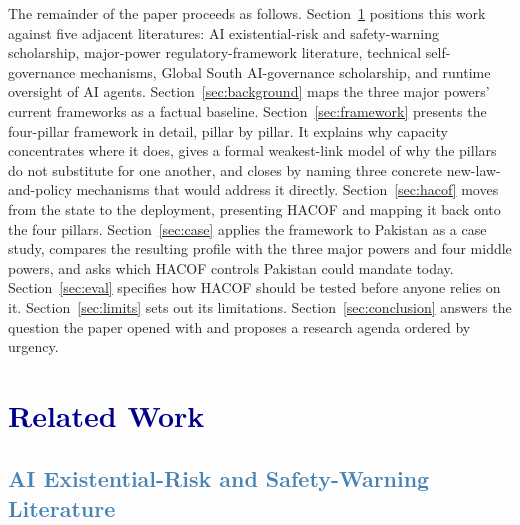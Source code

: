 \documentclass[journal]{IEEEtran}
\newcommand{\hacof}{HACOF}
\begin{document}
The remainder of the paper proceeds as follows. Section~\ref{sec:related} positions this work against five adjacent literatures: AI existential-risk and safety-warning scholarship, major-power regulatory-framework literature, technical self-governance mechanisms, Global South AI-governance scholarship, and runtime oversight of AI agents. Section~\ref{sec:background} maps the three major powers' current frameworks as a factual baseline. Section~\ref{sec:framework} presents the four-pillar framework in detail, pillar by pillar. It explains why capacity concentrates where it does, gives a formal weakest-link model of why the pillars do not substitute for one another, and closes by naming three concrete new-law-and-policy mechanisms that would address it directly. Section~\ref{sec:hacof} moves from the state to the deployment, presenting \hacof{} and mapping it back onto the four pillars. Section~\ref{sec:case} applies the framework to Pakistan as a case study, compares the resulting profile with the three major powers and four middle powers, and asks which \hacof{} controls Pakistan could mandate today. Section~\ref{sec:eval} specifies how \hacof{} should be tested before anyone relies on it. Section~\ref{sec:limits} sets out its limitations. Section~\ref{sec:conclusion} answers the question the paper opened with and proposes a research agenda ordered by urgency.

\section{\textcolor{darkblue}{Related Work}}
\label{sec:related}

\subsection{\textcolor{steelblue}{AI Existential-Risk and Safety-Warning Literature}}
\end{document}
